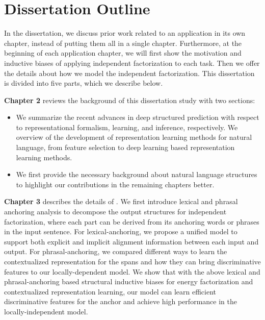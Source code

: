 
\section{Dissertation Outline}
\label{sec:intro:roadmap}

In the dissertation, we discuss prior work related to an application in its
own chapter, instead of putting them all in a single
chapter. Furthermore, at the beginning of each application chapter, we
will first show the motivation and inductive biases of applying
independent factorization to each task. Then we offer the details about
how we model the independent factorization. This dissertation is divided
into five parts, which we describe below.

\textbf{Chapter 2} reviews the background of this dissertation study
with two sections:
\begin{itemize}
\item {} We summarize
  the recent advances in deep structured prediction with respect to
  representational formalism, learning, and inference, respectively. We
  overview of the development of representation learning methods for
  natural language, from feature selection to deep learning based
  representation learning methods.

\item {} We first provide the necessary
  background about natural language structures to highlight our contributions in the remaining chapters better.
\end{itemize}

\textbf{Chapter 3} describes the details of . We first introduce
lexical and phrasal anchoring analysis to decompose the output
structures for independent factorization, where each part can be
derived from its anchoring words or phrases in the input sentence. For
lexical-anchoring, we propose a unified model to support both explicit
and implicit alignment information between each input and output. For
phrasal-anchoring, we compared different ways to learn the
contextualized representation for the spans and how they can bring
discriminative features to our locally-dependent model. We show that
with the above lexical and phrasal-anchoring based structural
inductive biases for energy factorization and contextualized
representation learning, our model can learn efficient discriminative
features for the anchor and achieve high performance in the
locally-independent model.

